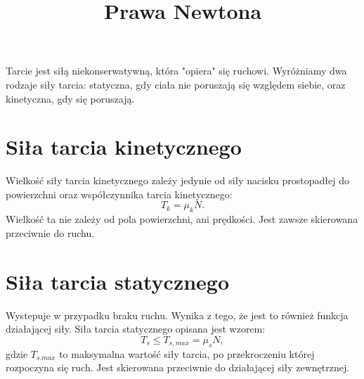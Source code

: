 \documentclass{article}
\title{Prawa Newtona}
\date{}
\begin{document}
\maketitle
Tarcie jest siłą niekonserwatywną, która "opiera" się ruchowi. Wyróżniamy dwa rodzaje siły tarcia: statyczna, gdy ciała nie poruszają się względem siebie, oraz kinetyczna, gdy się poruszają. 
\section{Siła tarcia kinetycznego}
Wielkość siły tarcia kinetycznego zależy jedynie od siły nacisku prostopadłej do powierzchni oraz współczynnika tarcia kinetycznego:
\begin{equation}
T_{k} = \mu_{k} N.
\end{equation}
Wielkość ta nie zależy od pola powierzchni, ani prędkości. Jest zawsze skierowana przeciwnie do ruchu. 

\section{Siła tarcia statycznego}
Wystepuje w przypadku braku ruchu. Wynika z tego, że jest to również funkcja działającej siły. Siła tarcia statycznego opisana jest wzorem:
\begin{equation}
T_{s} \leq T_{s,max} = \mu_{s} N,
\end{equation}
gdzie $T_{s.max}$ to maksymalna wartość siły tarcia, po przekroczeniu której rozpoczyna się ruch. Jest skierowana przeciwnie do działającej siły zewnętrznej. 
\end{document}
